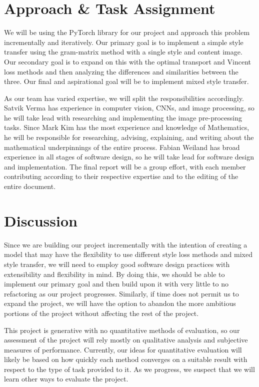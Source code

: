 \documentclass[12pt]{article}
\begin{document}
\section{Approach \& Task Assignment}
We will be using the PyTorch library for our project and approach this problem
incrementally and iteratively. Our primary goal is to implement a simple style
transfer using the gram-matrix method with a single style and content image.
Our secondary goal is to expand on this with the optimal transport and Vincent
loss methods and then analyzing the differences and similarities between the
three.  Our final and aspirational goal will be to implement mixed style
transfer.

As our team has varied expertise, we will split the responsibilities
accordingly.  Satvik Verma has experience in computer vision, CNNs, and image
processing, so he will take lead with researching and implementing the image
pre-processing tasks.  Since Mark Kim has the most experience and knowledge of
Mathematics, he will be responsible for researching, advising, explaining, and
writing about the mathematical underpinnings of the entire process.  Fabian
Weiland has broad experience in all stages of software design, so he will take
lead for software design and implementation. The final report will be a group
effort, with each member contributing according to their respective expertise
and to the editing of the entire document.

\section{Discussion}
Since we are building our project incrementally with the intention of creating a
model that may have the flexibility to use different style loss methods and
mixed style transfer, we will need to employ good software design practices with
extensibility and flexibility in mind.  By doing this, we should be able to
implement our primary goal and then build upon it with very little to no
refactoring as our project progresses.  Similarly, if time does not permit us to
expand the project, we will have the option to abandon the more ambitious
portions of the project without affecting the rest of the project.

This project is generative with no quantitative methods of evaluation, so our
assessment of the project will rely mostly on qualitative analysis and subjective
measures of performance.  Currently, our ideas for quantitative evaluation will
likely be based on how quickly each method converges on a suitable result with
respect to the type of task provided to it.  As we progress, we suspect that we
will learn other ways to evaluate the project.
\end{document}
